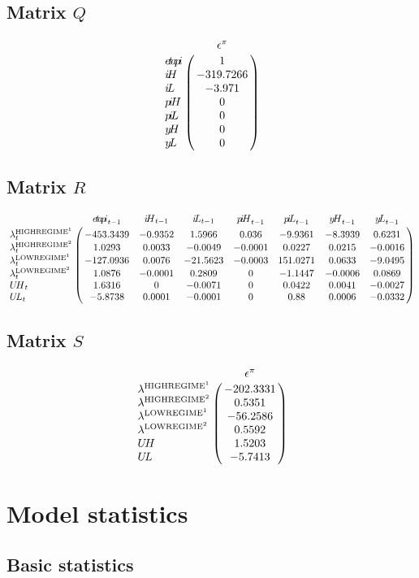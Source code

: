 \subsection*{Matrix $Q$}

$$\bordermatrix{
~ & \epsilon^{\pi} \cr
{e\!t\!a\!p\!i} & 1 \cr
{i\!H} & -319.7266 \cr
{i\!L} & -3.971 \cr
{p\!i\!H} & 0 \cr
{p\!i\!L} & 0 \cr
{y\!H} & 0 \cr
{y\!L} & 0 \cr
}$$

\subsection*{Matrix $R$}

$$\bordermatrix{
~ & {e\!t\!a\!p\!i}_{t-1} & {i\!H}_{t-1} & {i\!L}_{t-1} & {p\!i\!H}_{t-1} & {p\!i\!L}_{t-1} & {y\!H}_{t-1} & {y\!L}_{t-1} \cr
\lambda^{\mathrm{HIGHREGIME}^{\mathrm{1}}}_{t} & -453.3439 & -0.9352 & 1.5966 & 0.036 & -9.9361 & -8.3939 & 0.6231 \cr
\lambda^{\mathrm{HIGHREGIME}^{\mathrm{2}}}_{t} & 1.0293 & 0.0033 & -0.0049 & -0.0001 & 0.0227 & 0.0215 & -0.0016 \cr
\lambda^{\mathrm{LOWREGIME}^{\mathrm{1}}}_{t} & -127.0936 & 0.0076 & -21.5623 & -0.0003 & 151.0271 & 0.0633 & -9.0495 \cr
\lambda^{\mathrm{LOWREGIME}^{\mathrm{2}}}_{t} & 1.0876 & -0.0001 & 0.2809 & 0 & -1.1447 & -0.0006 & 0.0869 \cr
{U\!H}_{t} & 1.6316 & 0 & -0.0071 & 0 & 0.0422 & 0.0041 & -0.0027 \cr
{U\!L}_{t} & -5.8738 & 0.0001 & -0.0001 & 0 & 0.88 & 0.0006 & -0.0332 \cr
}$$

\subsection*{Matrix $S$}

$$\bordermatrix{
~ & \epsilon^{\pi} \cr
\lambda^{\mathrm{HIGHREGIME}^{\mathrm{1}}} & -202.3331 \cr
\lambda^{\mathrm{HIGHREGIME}^{\mathrm{2}}} & 0.5351 \cr
\lambda^{\mathrm{LOWREGIME}^{\mathrm{1}}} & -56.2586 \cr
\lambda^{\mathrm{LOWREGIME}^{\mathrm{2}}} & 0.5592 \cr
{U\!H} & 1.5203 \cr
{U\!L} & -5.7413 \cr
}$$


\section{Model statistics}

\subsection{Basic statistics}

